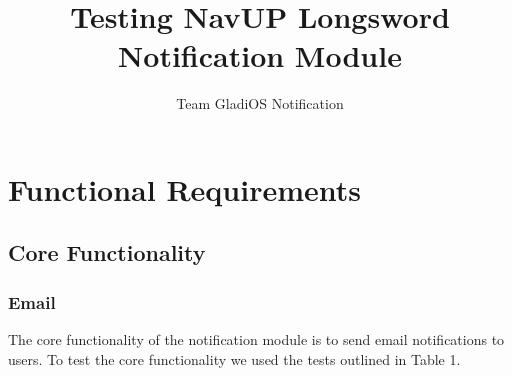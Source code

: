 \documentclass[11pt]{article}
\author{Team GladiOS Notification}
\title{Testing NavUP Longsword Notification Module}
\begin{document}
	\setlength{\parskip}{6pt}
	
	
	
	\tableofcontents
	
	\newpage
	
	\section{Functional Requirements}
	\subsection{Core Functionality}
	\subsubsection{Email}
	The core functionality of the notification module is to send email notifications to users. To test the core functionality we used the tests outlined in Table 1.
\end{document}
